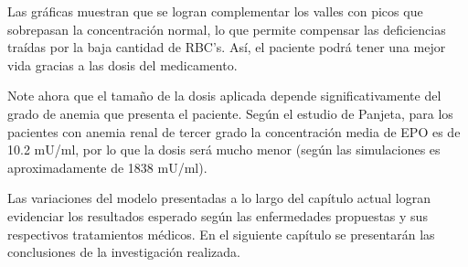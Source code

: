 Las gráficas muestran que se logran complementar los valles con picos que sobrepasan la concentración normal, lo que permite compensar las deficiencias traídas por la baja cantidad de RBC's. Así, el paciente podrá tener una mejor vida gracias a las dosis del medicamento.

Note ahora que el tamaño de la dosis aplicada depende significativamente del grado de anemia que presenta el paciente. Según el estudio de Panjeta, para los pacientes con anemia renal de tercer grado la concentración media de EPO es de 10.2 mU/ml, por lo que la dosis será mucho menor (según las simulaciones es aproximadamente de 1838 mU/ml).

Las variaciones del modelo presentadas a lo largo del capítulo actual logran evidenciar los resultados esperado según las enfermedades propuestas y sus respectivos tratamientos médicos. En el siguiente capítulo se presentarán las conclusiones de la investigación realizada.